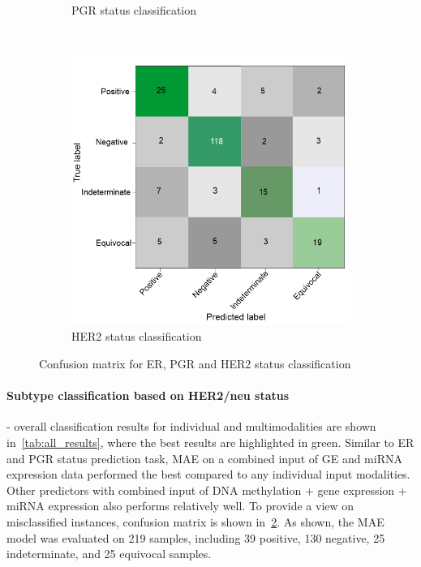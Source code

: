 \begin{figure}[h]
\begin{subfigure}{.49\linewidth}
		\caption{PGR status classification}
        \label{fig:pgr_confusion}
	\end{subfigure}\\[1ex]
	\begin{subfigure}{0.49\linewidth}
		\centering
		\includegraphics[scale=0.8]{images/conf_her2.png}
		\caption{HER2 status classification }
        \label{fig:her2_confusion}
	\end{subfigure}
	\caption{Confusion matrix for ER, PGR and HER2 status classification~\cite{karimACCESS2019}} 
	\label{fig:multi_cms}
\end{figure}

\paragraph{Subtype classification based on HER2/neu status} - overall classification results for individual and multimodalities are shown in~\cref{tab:all_results}, where the best results are highlighted in green. Similar to ER and PGR status prediction task, MAE on a combined input of GE and miRNA expression data performed the best compared to any individual input modalities. Other predictors with combined input of DNA methylation + gene expression + miRNA expression also performs relatively well. To provide a view on misclassified instances, confusion matrix is shown in~\cref{fig:her2_confusion}. As shown, the MAE model was evaluated on 219 samples, including 39 positive, 130 negative, 25 indeterminate, and 25 equivocal samples. 

